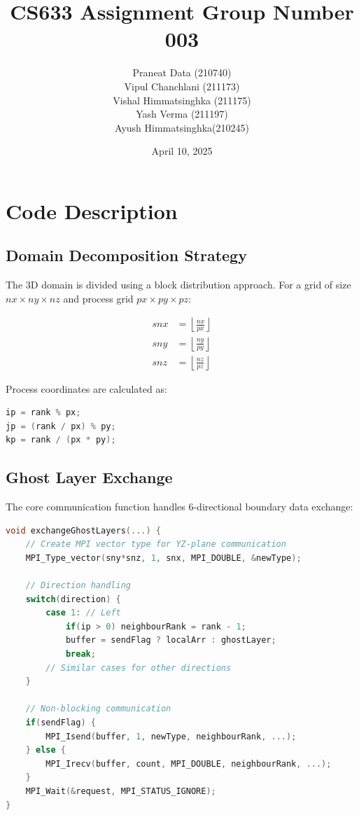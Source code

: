 \documentclass{article}
\title{CS633 Assignment Group Number 003}
\author{Praneat Data (210740)\\ Vipul Chanchlani (211173)\\ Vishal Himmatsinghka (211175)\\Yash Verma (211197)\\ Ayush Himmatsinghka(210245)}
\date{April 10, 2025}
\begin{document}
\maketitle

\section{Code Description}

\subsection{Domain Decomposition Strategy}
The 3D domain is divided using a block distribution approach. For a grid of size $nx \times ny \times nz$ and process grid $px \times py \times pz$:

\begin{align*}
snx &= \left\lfloor\frac{nx}{px}\right\rfloor \\
sny &= \left\lfloor\frac{ny}{py}\right\rfloor \\
snz &= \left\lfloor\frac{nz}{pz}\right\rfloor
\end{align*}

Process coordinates are calculated as:
\begin{lstlisting}[language=C]
ip = rank % px;
jp = (rank / px) % py;
kp = rank / (px * py);
\end{lstlisting}

\subsection{Ghost Layer Exchange}
The core communication function handles 6-directional boundary data exchange:

\begin{lstlisting}[language=C]
void exchangeGhostLayers(...) {
    // Create MPI vector type for YZ-plane communication
    MPI_Type_vector(sny*snz, 1, snx, MPI_DOUBLE, &newType);
    
    // Direction handling
    switch(direction) {
        case 1: // Left
            if(ip > 0) neighbourRank = rank - 1;
            buffer = sendFlag ? localArr : ghostLayer;
            break;
        // Similar cases for other directions
    }
    
    // Non-blocking communication
    if(sendFlag) {
        MPI_Isend(buffer, 1, newType, neighbourRank, ...);
    } else {
        MPI_Irecv(buffer, count, MPI_DOUBLE, neighbourRank, ...);
    }
    MPI_Wait(&request, MPI_STATUS_IGNORE);
}
\end{lstlisting}
\end{document}

